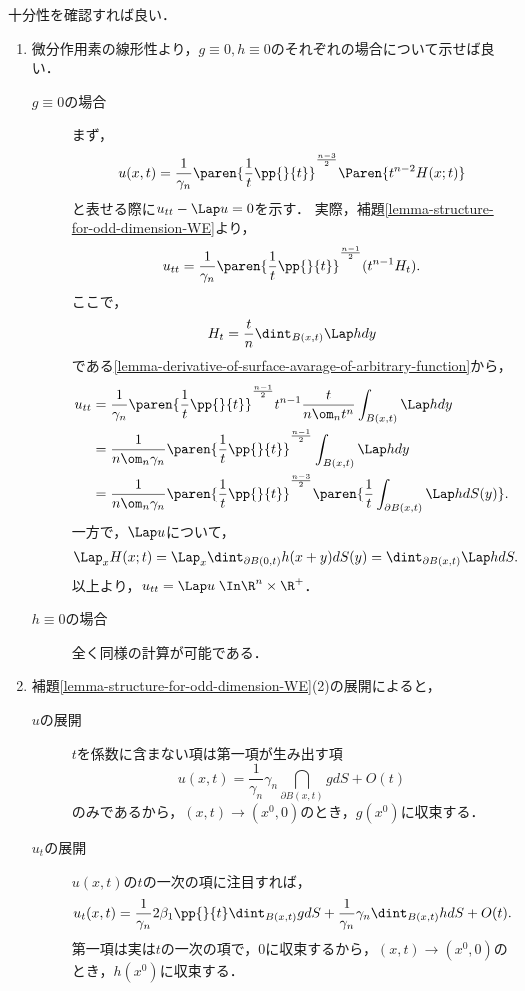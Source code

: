 \documentclass[uplatex,dvipdfmx]{jsreport}
\begin{document}
\begin{Proof}
    十分性を確認すれば良い．
    \begin{enumerate}
        \item 微分作用素の線形性より，$g\equiv0,h\equiv0$のそれぞれの場合について示せば良い．
        \begin{description}
            \item[$g\equiv0$の場合] まず，
            \[u(x,t)=\frac{1}{\gamma_n}\paren{\frac{1}{t}\pp{}{t}}^{\frac{n-3}{2}}\Paren{t^{n-2}H(x;t)}\]
            と表せる際に$u_{tt}-\Lap u=0$を示す．
            実際，補題\ref{lemma-structure-for-odd-dimension-WE}より，
            \[u_{tt}=\frac{1}{\gamma_n}\paren{\frac{1}{t}\pp{}{t}}^{\frac{n-1}{2}}(t^{n-1}H_t).\]
            ここで，
            \[H_t=\frac{t}{n}\dint_{B(x,t)}\Lap hdy\]
            である\ref{lemma-derivative-of-surface-avarage-of-arbitrary-function}から，
            \begin{align*}
                u_{tt}&=\frac{1}{\gamma_n}\paren{\frac{1}{t}\pp{}{t}}^{\frac{n-1}{2}}t^{n-1}\frac{t}{n\om_nt^n}\int_{B(x,t)}\Lap hdy\\
                &=\frac{1}{n\om_n\gamma_n}\paren{\frac{1}{t}\pp{}{t}}^{\frac{n-1}{2}}\int_{B(x,t)}\Lap hdy\\
                &=\frac{1}{n\om_n\gamma_n}\paren{\frac{1}{t}\pp{}{t}}^{\frac{n-3}{2}}\paren{\frac{1}{t}\int_{\partial B(x,t)}\Lap hdS(y)}.
            \end{align*}
            一方で，$\Lap u$について，
            \begin{align*}
                \Lap_xH(x;t)&=\Lap_x\dint_{\partial B(0,t)}h(x+y)dS(y)=\dint_{\partial B(x,t)}\Lap hdS.
            \end{align*}
            以上より，$u_{tt}=\Lap u\;\In\R^n\times\R^+$．
            \item[$h\equiv0$の場合] 全く同様の計算が可能である．
        \end{description}
        \item 補題\ref{lemma-structure-for-odd-dimension-WE}(2)の展開によると，
        \begin{description}
            \item[$u$の展開] $t$を係数に含まない項は第一項が生み出す項
            \[u(x,t)=\frac{1}{\gamma_n}\gamma_n\dint_{\partial B(x,t)}gdS+O(t)\]
            のみであるから，$(x,t)\to(x^0,0)$のとき，$g(x^0)$に収束する．
            \item[$u_t$の展開] $u(x,t)$の$t$の一次の項に注目すれば，
            \[u_t(x,t)=\frac{1}{\gamma_n}2\beta_1\pp{}{t}\dint_{B(x,t)}gdS+\frac{1}{\gamma_n}\gamma_n\dint_{B(x,t)}hdS+O(t).\]
            第一項は実は$t$の一次の項で，$0$に収束するから，$(x,t)\to(x^0,0)$のとき，$h(x^0)$に収束する．
        \end{description}
    \end{enumerate}
\end{Proof}
\end{document}
